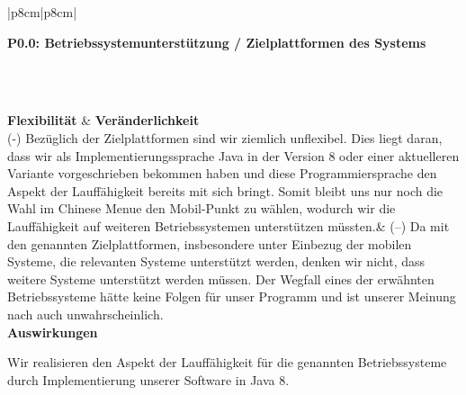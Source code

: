 \documentclass[enabledeprecatedfontcommands,fontsize=11pt,paper=a4,twoside]{scrartcl}
\newcounter{one}
\newcounter{two}[one]
\newcommand{\tone}{0\theone}
\newcommand{\two}{\stepcounter{two}0\thetwo}
\begin{document}
\newpage
\begin{tabular} {|p{8cm}|p{8cm}|}
	\hline
	 {\parbox{16cm}{\textbf{\hypertarget{f}{P\tone.\two}: Betriebssystemunterstützung / Zielplattformen des Systems} }}\\ \hline \hline
	\rule{0pt}{5ex}\\ [3ex] \hline
	\textbf{Flexibilität}  & \textbf{Veränderlichkeit} \\ 
	(-) Bezüglich der Zielplattformen sind wir ziemlich unflexibel. Dies liegt daran, dass wir als Implementierungssprache Java in der Version 8 oder einer aktuelleren Variante vorgeschrieben bekommen haben und diese Programmiersprache den Aspekt der Lauffähigkeit bereits mit sich bringt. Somit bleibt uns nur noch die Wahl im Chinese Menue den Mobil-Punkt zu wählen, wodurch wir die Lauffähigkeit auf weiteren Betriebssystemen unterstützen müssten.&
	(--) Da mit den genannten Zielplattformen, insbesondere unter Einbezug der mobilen Systeme, die relevanten Systeme unterstützt werden, denken wir nicht, dass weitere Systeme unterstützt werden müssen. Der Wegfall eines der erwähnten Betriebssysteme hätte keine Folgen für unser Programm und ist unserer Meinung nach auch unwahrscheinlich. \\ \hline
	 {\textbf{Auswirkungen}} \\
	 {\parbox{16cm}{Wir realisieren den Aspekt der Lauffähigkeit für die genannten Betriebssysteme durch Implementierung unserer Software in Java 8.} }\\[2ex] \hline
\end{tabular}
\\ \\ \\ \\ \\
\end{document}
